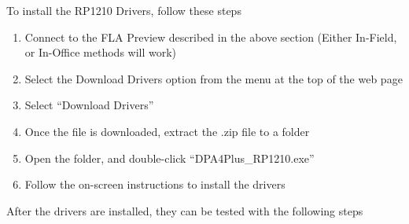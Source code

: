 \documentclass[11pt, oneside]{book}
\begin{document}
To install the RP1210 Drivers, follow these steps
\begin{enumerate}
\item Connect to the FLA Preview described in the above section (Either In-Field,
or In-Office methods will work)
\item Select the Download Drivers option from the menu at the top of the
web page
\item Select ``Download Drivers''
\item Once the file is downloaded, extract the .zip file to a folder
\item Open the folder, and double-click ``DPA4Plus\_RP1210.exe''
\item Follow the on-screen instructions to install the drivers
\end{enumerate}
After the drivers are installed, they can be tested with the following
steps
\end{document}
